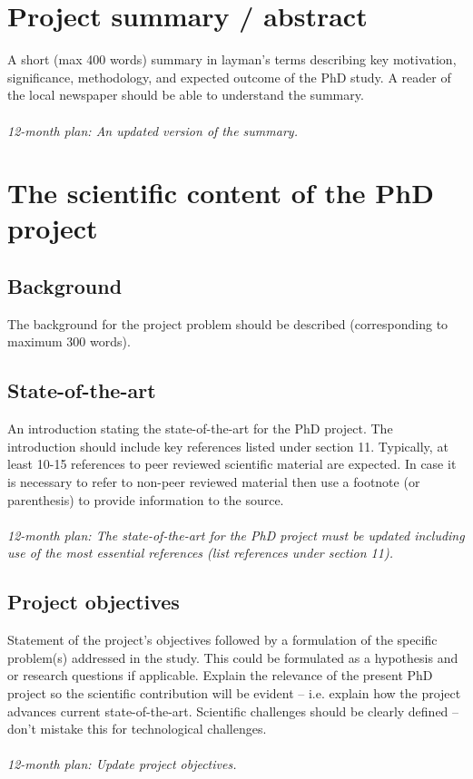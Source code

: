 \section{Project summary / abstract}

A short (max 400 words) summary in layman’s terms describing key motivation, significance, methodology, and expected outcome of the PhD study. A reader of the local newspaper should be able to understand the summary. 
\\
\\
\textit{12-month plan: An updated version of the summary.}  

\section{The scientific content of the PhD project}

\subsection{Background}
The background for the project problem should be described (corresponding to maximum 300 words).

\subsection{State-of-the-art}
An introduction stating the state-of-the-art for the PhD project. The introduction should include key references listed under section 11. Typically, at least 10-15 references to peer reviewed scientific material are expected. In case it is necessary to refer to non-peer reviewed material then use a footnote (or parenthesis) to provide information to the source. 
\\
\\
\textit{12-month plan: The state-of-the-art for the PhD project must be updated including use of the most essential references (list references under section 11).}

\subsection{Project objectives}
Statement of the project’s objectives followed by a formulation of the specific problem(s) addressed in the study. This could be formulated as a hypothesis and or research questions if applicable. Explain the relevance of the present PhD project so the scientific contribution will be evident – i.e. explain how the project advances current state-of-the-art. Scientific challenges should be clearly defined – don’t mistake this for technological challenges.
\\
\\
\textit{12-month plan: Update project objectives.}

